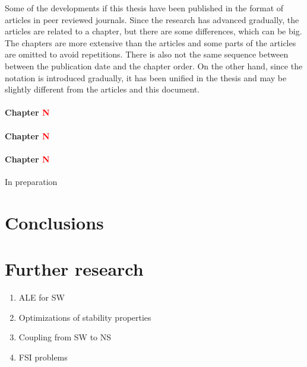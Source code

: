 Some of the developments if this thesis have been published in the format of articles in peer reviewed journals. Since the research has advanced gradually, the articles are related to a chapter, but there are some differences, which can be big.
The chapters are more extensive than the articles and some parts of the articles are omitted to avoid repetitions.
There is also not the same sequence between between the publication date and the chapter order.
On the other hand, since the notation is introduced gradually, it has been unified in the thesis and may be slightly different from the articles and this document.

\paragraph{Chapter \textcolor{red}{\bfseries N}} 
\paragraph{Chapter \textcolor{red}{\bfseries N}} 
\paragraph{Chapter \textcolor{red}{\bfseries N}} In preparation




\section{Conclusions}





\section{Further research}


\begin{enumerate}
    \item ALE for SW
    \item Optimizations of stability properties
    \item Coupling from SW to NS
    \item FSI problems
\end{enumerate}

